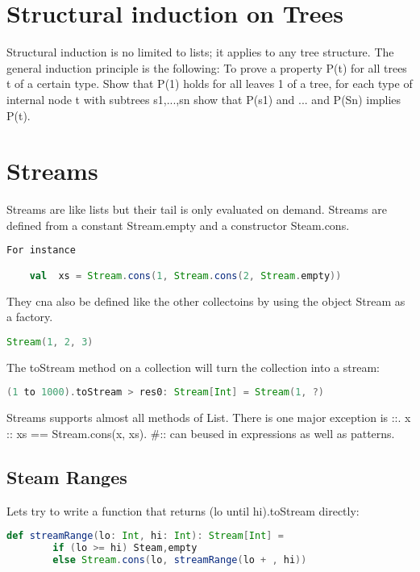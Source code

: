 \documentclass[10pt, a4paper]{report}
\begin{document}
\section{Structural induction on Trees}
Structural induction is no limited to lists; it applies to any tree structure. The general induction principle is the following: To prove a property P(t) for all trees t of a certain type. Show that P(1) holds for all leaves 1 of a tree, for each type of internal node t with subtrees s1,...,sn show that P(s1) and ... and P(Sn) implies P(t).

\section{Streams}
Streams are like lists but their tail is only evaluated on demand. Streams are defined from a constant Stream.empty and a constructor Steam.cons.

\begin{lstlisting}[language=scala]
For instance

	val  xs = Stream.cons(1, Stream.cons(2, Stream.empty))

\end{lstlisting}

They cna also be defined like the other collectoins by using the object Stream as a factory.

\begin{lstlisting}[language=scala]
	Stream(1, 2, 3)
\end{lstlisting}

The toStream method on a collection will turn the collection into a stream:

\begin{lstlisting}[language=scala]
	(1 to 1000).toStream > res0: Stream[Int] = Stream(1, ?)
\end{lstlisting}

Streams supports almost all methods of List. There is one major exception is ::. x :: xs == Stream.cons(x, xs). \#:: can beused in expressions as well as patterns.

\subsection{Steam Ranges}

Lets try to write a function that returns (lo until hi).toStream directly:

\begin{lstlisting}[language=scala]
	def streamRange(lo: Int, hi: Int): Stream[Int] =
		if (lo >= hi) Steam,empty
		else Stream.cons(lo, streamRange(lo + , hi))
\end{lstlisting}
\end{document}

